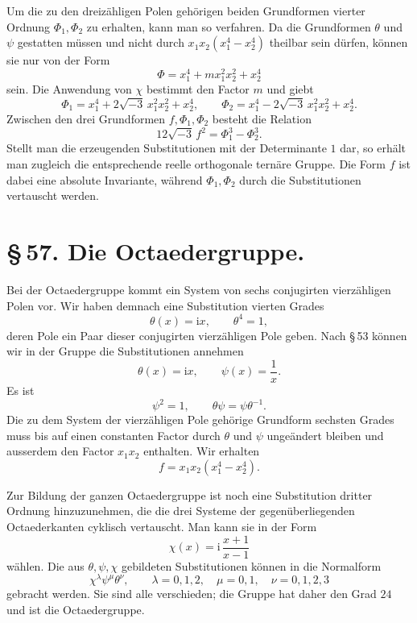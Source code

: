 \documentclass[11pt]{article}
\providecommand{\ii}{\mathrm{i}}
\begin{document}
Um die zu den dreizähligen Polen gehörigen beiden Grundformen vierter Ordnung $\Phi_1,\Phi_2$ zu erhalten, kann man so verfahren. Da die Grundformen $\theta$ und $\psi$ gestatten müssen und nicht durch $x_1x_2(x_1^4-x_2^4)$ theilbar sein dürfen, können sie nur von der Form
\[
 \Phi=x_1^4+m x_1^2x_2^2+x_2^4
\]
sein. Die Anwendung von $\chi$ bestimmt den Factor $m$ und giebt
\begin{equation}
 \Phi_1=x_1^4+2\sqrt{-3}\,x_1^2x_2^2+x_2^4,\qquad
 \Phi_2=x_1^4-2\sqrt{-3}\,x_1^2x_2^2+x_2^4.
\tag{7}
\end{equation}
Zwischen den drei Grundformen $f,\Phi_1,\Phi_2$ besteht die Relation
\begin{equation}
 12\sqrt{-3}\, f^2=\Phi_1^3-\Phi_2^3 .
\tag{8}
\end{equation}
Stellt man die erzeugenden Substitutionen mit der Determinante $1$ dar, so erhält man zugleich die entsprechende reelle orthogonale ternäre Gruppe. Die Form $f$ ist dabei eine absolute Invariante, während $\Phi_1,\Phi_2$ durch die Substitutionen vertauscht werden.

\section*{\S\,57. Die Octaedergruppe.}

Bei der Octaedergruppe kommt ein System von sechs conjugirten vierzähligen Polen vor. Wir haben demnach eine Substitution vierten Grades
\[
 \theta(x)=\ii x,\qquad \theta^4=1,
\]
deren Pole ein Paar dieser conjugirten vierzähligen Pole geben. Nach \S\,53 können wir in der Gruppe die Substitutionen annehmen
\begin{equation}
 \theta(x)=\ii x,\qquad \psi(x)=\frac1x.
\tag{1}
\end{equation}
Es ist
\begin{equation}
 \psi^2=1,\qquad \theta\psi=\psi\theta^{-1}.
\tag{2}
\end{equation}
Die zu dem System der vierzähligen Pole gehörige Grundform sechsten Grades muss bis auf einen constanten Factor durch $\theta$ und $\psi$ ungeändert bleiben und ausserdem den Factor $x_1x_2$ enthalten. Wir erhalten
\begin{equation}
 f=x_1x_2(x_1^4-x_2^4).
\tag{3}
\end{equation}

Zur Bildung der ganzen Octaedergruppe ist noch eine Substitution dritter Ordnung hinzuzunehmen, die die drei Systeme der gegenüberliegenden Octaederkanten cyklisch vertauscht. Man kann sie in der Form
\begin{equation}
 \chi(x)=\ii\,\frac{x+1}{x-1}
\tag{4}
\end{equation}
wählen. Die aus $\theta,\psi,\chi$ gebildeten Substitutionen können in die Normalform
\begin{equation}
 \chi^\lambda\psi^\mu\theta^\nu,\qquad
 \lambda=0,1,2,\quad \mu=0,1,\quad \nu=0,1,2,3
\tag{5}
\end{equation}
gebracht werden. Sie sind alle verschieden; die Gruppe hat daher den Grad $24$ und ist die Octaedergruppe.
\end{document}
